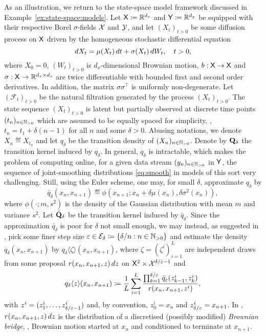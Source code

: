 \begin{example}
\label{eq:durham:gallant}
As an illustration, we return to the state-space model framework discussed in Example~\ref{ex:state-space:models}. Let $\mathsf{X} \coloneqq \mathbb{R}^{d_x}$ and $\mathsf{Y} \coloneqq \mathbb{R}^{d_y}$ be equipped with their respective Borel $\sigma$-fields $\mathcal{X}$ and $\mathcal{Y}$, and let $(X_t)_{t > 0}$ be some diffusion process on $\mathsf{X}$ driven by the homogeneous stochastic differential equation
\begin{equation} \label{eq:SDE}
\rmd X_t = \mu(X_t) \, \rmd t + \sigma(X_t) \, \rmd W_t, \quad t > 0, 
\end{equation}
where $X_0 = 0$, $(W_t)_{t > 0}$ is $d_x$-dimensional Brownian motion, $b : \mathsf{X} \to \mathsf{X}$ and $\sigma : \mathsf{X} \to \mathbb{R}^{d_x \times d_x}$ are twice differentiable with bounded first and second order derivatives. In addition, the matrix $\sigma \sigma^\intercal$ is uniformly non-degenerate. Let $(\mathcal{F}_t)_{t > 0}$ be the natural filtration generated by the process $(X_t)_{t > 0}$. The state sequence $(X_t)_{t > 0}$ is latent but partially observed at discrete time points $(t_n)_{n \in \mathbb{N}_{> 0}}$ which are assumed to be equally spaced for simplicity, \ie, $t_n = t_1 + \delta (n - 1)$ for all $n$ and some $\delta > 0$. Abusing notations, we denote $X_n \eqdef X_{t_n}$ and let $q_\delta$ be the transition density of $(X_n)_{n \in \mathbb{N}_{> 0}}$. Denote by $\mathbf{Q}_\delta$ the transition kernel induced by $q_\delta$. In general, $q_\delta$ is intractable, which makes the problem of computing online, for a given data stream $(y_n)_{n \in \mathbb{N}_{> 0}}$ in $\mathsf{Y}$, the sequence of joint-smoothing distributions \eqref{eq:smooth} in models of this sort very challenging. Still, using the Euler scheme, one may, for small $\delta$, approximate $q_\delta$ by 
$$
\bar{q}_\delta(x_n, x_{n + 1}) \eqdef \phi(x_{n + 1}; x_n + \delta \mu(x_n), \delta \sigma^2(x_n)), 
$$ 
where $\phi(\cdot; m, s^2)$ is the density of the Gaussian distribution with mean $m$ and variance $s^2$. Let $\bar{\mathbf{Q}}_\delta$ be the transition kernel induced by $\bar{q}_\delta$. Since the approximation $\bar{q}_\delta$ is poor for $\delta$ not small enough, we may instead, as suggested in \cite{durham:gallant:2002}, pick some finer step size $\varepsilon \in \mathcal{E}_\delta \coloneqq \{ \delta / n : n \in \mathbb{N}_{> 0} \}$ and estimate the density $q_\delta(x_n, x_{n + 1})$ by $q_\delta \langle \zeta \rangle (x_n, x_{n + 1})$, where $\zeta = (\zeta^i)_{i = 1}^L$ are independent draws from some proposal $r(x_n, x_{n + 1}, z) \, d z$ on $\mathsf{X}^2 \times \mathcal{X}^{\delta / \varepsilon - 1}$ and  
$$
q_\delta \langle z \rangle (x_n, x_{n + 1}) \coloneqq \frac{1}{L} \sum_{i = 1}^L \frac{\prod_{k = 1}^{\delta / \varepsilon} \bar{q}_\varepsilon(z_{k - 1}^i, z_k^i)}{r(x_n, x_{n + 1}, z^i)},  
$$
with $z^i = (z_1^i, \ldots, z_{\delta / \varepsilon - 1}^i)$ and, by convention, $z_0^i = x_n$ and $z_{\delta / \varepsilon}^i = x_{n + 1}$. In \cite{durham:gallant:2002}, $r(x_n, x_{n + 1}, z) \, d z$ is the distribution of a discretised (possibly modified) \emph{Brownian bridge}, \ie, Brownian motion started at $x_n$ and conditioned to terminate at $x_{n + 1}$. 


\end{example}
